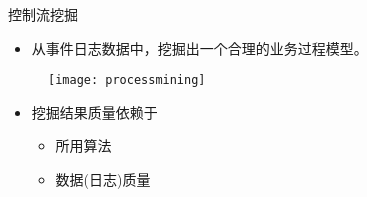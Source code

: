 \begin{frame}{控制流挖掘}
	\begin{itemize}
	\item 从事件日志数据中，挖掘出一个合理的业务过程模型。
	\end{itemize}
\begin{figure}
 \begin{center}
 \texttt{[image: processmining]}
 \end{center}
\end{figure}
\begin{itemize}
	\item 挖掘结果质量依赖于
		\begin{itemize}
			\item 所用算法
			\item 数据(日志)质量
		\end{itemize}
\end{itemize}
\end{frame}

